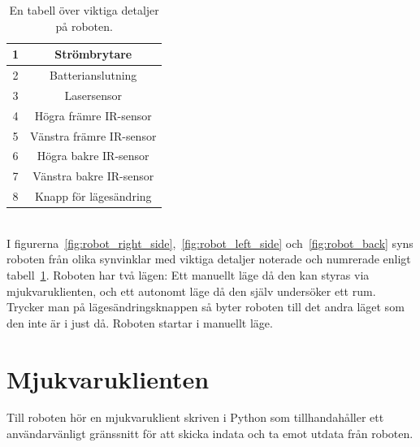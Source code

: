 \documentclass{article}
\begin{document}
\begin{table}[H]
\centering
\caption{En tabell över viktiga detaljer på roboten.}
\begin{tabular}{ | c | c | }
\hline
1 & Strömbrytare \\
\hline
2 & Batterianslutning \\
\hline
3 & Lasersensor \\
\hline
4 & Högra främre IR-sensor \\
\hline
5 & Vänstra främre IR-sensor \\
\hline
6 & Högra bakre IR-sensor \\
\hline
7 & Vänstra bakre IR-sensor \\
\hline
8 & Knapp för lägesändring \\
\hline
\end{tabular}
\label{table:components}
\end{table}
\ \\
I figurerna~\ref{fig:robot_right_side},~\ref{fig:robot_left_side} och~\ref{fig:robot_back} syns roboten från olika synvinklar med viktiga detaljer noterade och numrerade enligt tabell~\ref{table:components}. Roboten har två lägen: Ett manuellt läge då den kan styras via mjukvaruklienten, och ett autonomt läge då den själv undersöker ett rum. Trycker man på lägesändringsknappen så byter roboten till det andra läget som den inte är i just då. Roboten startar i manuellt läge. \newline\newline

\clearpage
\section{Mjukvaruklienten}
Till roboten hör en mjukvaruklient skriven i Python som tillhandahåller ett användarvänligt gränssnitt för att skicka indata och ta emot utdata från roboten.
\end{document}
